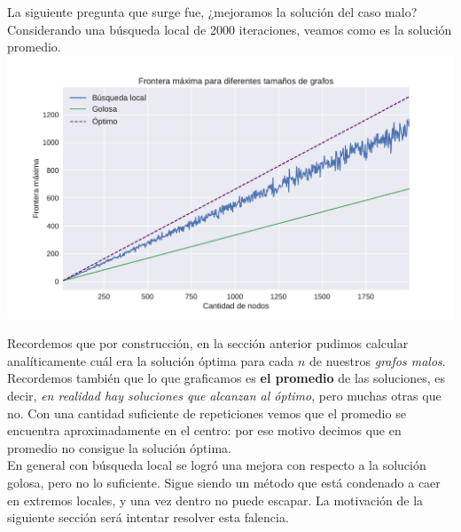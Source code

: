 La siguiente pregunta que surge fue, ¿mejoramos la solución del caso malo? Considerando una búsqueda local de 2000 iteraciones, veamos como es la solución promedio. \\

{\centering
    \includegraphics[width=1\textwidth]{informe/imgs/exp_malo_frontera_greedy_local_2000_optimo.pdf}
}

Recordemos que por construcción, en la sección anterior pudimos calcular analíticamente cuál era la solución óptima para cada $n$ de nuestros \textit{grafos malos}. Recordemos también que lo que graficamos es \textbf{el promedio} de las soluciones, es decir, \textit{en realidad hay soluciones que alcanzan al óptimo}, pero muchas otras que no. Con una cantidad suficiente de repeticiones vemos que el promedio se encuentra aproximadamente en el centro: por ese motivo decimos que en promedio no consigue la solución óptima. \\

En general con búsqueda local se logró una mejora con respecto a la solución golosa, pero no lo suficiente. Sigue siendo un método que está condenado a caer en extremos locales, y una vez dentro no puede escapar. La motivación de la siguiente sección será intentar resolver esta falencia.
